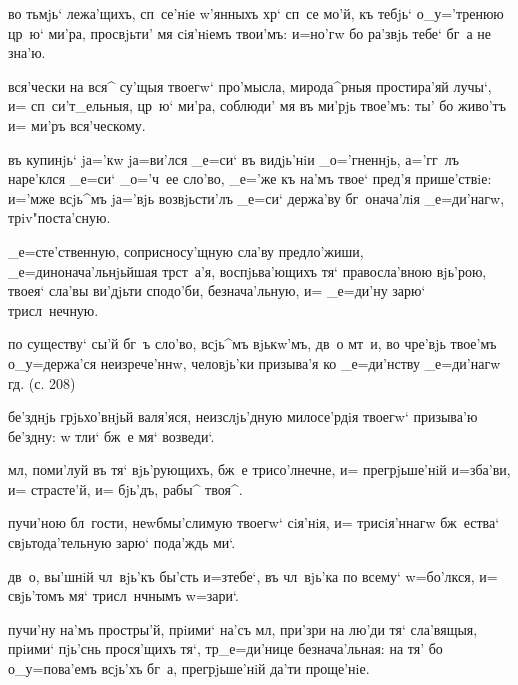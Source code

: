 
  во тьмjь` лежа'щихъ, 
сп~се'нiе w'янныхъ хр` сп~се мо'й, къ тебjь` 
о_у='тренюю цр~ю` ми'ра, просвjьти' мя сiя'нiемъ твои'мъ: 
и=но'гw бо ра'звjь тебе` бг~а не зна'ю.

 вся'чески на вся^ су'щыя твоегw` про'мысла, 
мирода^рныя простира'яй лучы`, и= сп~си'т_ельныя, цр~ю` 
ми'ра, соблюди' мя въ ми'рjь твое'мъ: ты' бо живо'тъ и= 
ми'ръ вся'ческому.

 въ купинjь` jа='кw jа=ви'лся _е=си` въ 
видjь'нiи _о='гненнjь, а='гг~лъ наре'клся _е=си` _о='ч~ее 
сло'во, _е='же къ на'мъ твое` пред'я прише'ствiе: 
и='мже всjь^мъ jа='вjь возвjьсти'лъ _е=си` держа'ву 
бг~онача'лiя _е=ди'нагw, трiv"поста'сную.

  _е=сте'ственную, соприсносу'щную 
сла'ву предло'жиши, _е=динонача'льнjьйшая тр ст~а'я, 
воспjьва'ющихъ тя` правосла'вною вjь'рою, твоея` сла'вы 
ви'дjьти сподо'би, безнача'льную, и= _е=ди'ну зарю` 
трисл~нечную.

  по существу` сы'й 
бг~ъ сло'во, всjь^мъ вjькw'мъ, дв~о мт~и, во чре'вjь 
твое'мъ о_у=держа'ся неизрече'ннw, человjь'ки призыва'я 
ко _е=ди'нству _е=ди'нагw гд. (с. 208)


  бе'зднjь грjьхо'внjьй валя'яся, 
неизслjь'дную милосе'рдiя твоегw` призыва'ю бе'здну: w\т 
тли` бж~е мя` возведи`.

 мл, поми'луй въ тя` вjь'рующихъ, 
бж~е трисо'лнечне, и= прегрjьше'нiй и=зба'ви, и= 
страсте'й, и= бjь'дъ, рабы^ твоя^. 

  пучи'ною бл~гости, 
неwбмы'слимую твоегw` сiя'нiя, и= трисiя'ннагw бж~ества` 
свjьтода'тельную зарю` пода'ждь ми`.

  дв~о, вы'шнiй 
чл~вjь'къ бы'сть и=з\ъ тебе`, въ чл~вjь'ка по всему` 
w=бо'лкся, и= свjь'томъ мя` трисл~нчнымъ w=зари`.

    

 пучи'ну на'мъ простры'й, прiими` 
на'съ мл, при'зри на лю'ди тя` сла'вящыя, прiими` 
пjь'снь прося'щихъ тя`, тр _е=ди'нице безнача'льная: 
на тя' бо о_у=пова'емъ всjь'хъ бг~а, прегрjьше'нiй да'ти 
проще'нiе.

